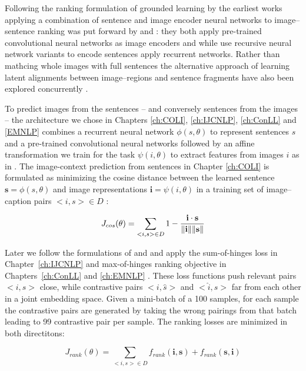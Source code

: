 Following the ranking formulation of grounded learning by \citep{hodosh2013framing}
the earliest works applying a combination of sentence and image encoder neural networks
to image--sentence ranking was put forward by \cite{kiros2014unifying} and \cite{socher2014grounded}:
they both apply pre-trained convolutional neural networks as image encoders and while 
\cite{socher2014grounded} use recursive neural network variants to encode sentences 
\cite{kiros2014unifying} apply recurrent networks. Rather than mathcing whole images with full
sentences the alternative approach of learning latent alignments between image--regions and
sentence fragments have also been explored concurrently \citep{karpathy2014deep,karpathy2015deep}.


To predict images from the sentences -- and conversely sentences from the images --
the architecture we chose in
Chapters \ref{ch:COLI}, \ref{ch:IJCNLP}, \ref{ch:ConLL} and \ref{EMNLP}  combines 
a recurrent neural network $\phi(s, \theta)$ to
represent sentences $s$ and a pre-trained convolutional neural networks 
followed by an affine transformation we train for the task  $\psi(i, \theta)$ 
to extract features from images $i$  as in \citep{kiros2014unifying}. 
The image-context prediction from sentences in 
Chapter \ref{ch:COLI} is formulated  as minimizing the cosine distance
between the learned sentence $\mathbf{s} = \phi(s, \theta)$ and image representations 
$\mathbf{i} = \psi(i, \theta)$ in a training set of image--caption pairs $<i,s> \in D$ :

\begin{equation}
J_{cos}(\theta) = \sum_{<i,s> \in D} 1 - \frac{\mathbf{i} \cdot \mathbf{s}}{\| \mathbf{i}\| \| \mathbf{s} \|} \\
\end{equation}

Later we follow the formulations of \cite{vendrov2015order} and \cite{faghri2017vse++} and apply 
the sum-of-hinges loss in Chapter~\ref{ch:IJCNLP} and max-of-hinges ranking objective
in Chapters~\ref{ch:ConLL} and \ref{ch:EMNLP} . These loss functions 
push relevant pairs $<i, s>$ close, while contrastive pairs  $<i, \hat{s}>$ and $<\hat{i}, s>$
far from each other in a joint embedding space. Given a mini-batch of a 100 samples, for each sample
the contrastive pairs are generated by taking the wrong pairings from that batch leading to 
99 contrastive pair per sample. The ranking losses are minimized in both directitons:

\begin{equation}
J_{rank}(\theta) = \sum_{<i,s> \in D} f_{rank}(\mathbf{i}, \mathbf{s}) + f_{rank}(\mathbf{s}, \mathbf{i}) 
\end{equation}

